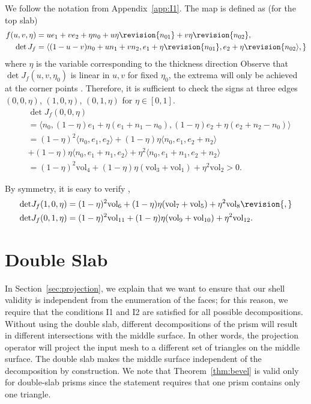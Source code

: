 We follow the notation from {Appendix~\ref{app:I1}.} 
The map is defined as (for the top slab)
\begin{align*}
    f(u,v,\eta) &= u e_1 + v e_2  + \eta n_0 + u \eta \revision{n_{01}} +
    v \eta \revision{n_{02}},\\
    \det J_f &=  \langle (1-u-v) n_0 + u n_1 + v n_2, e_1 + \eta \revision{n_{01}},
    e_2 + \eta \revision{n_{02} \rangle,}
\end{align*}
where $\eta$ is the variable corresponding to the thickness direction
Observe that $\det J_f(u,v,\eta_0)$ is linear in $u,v$ for fixed $\eta_0$, the extrema will only be achieved at the corner points \cite{knabner2001invertibility}. Therefore, it is sufficient to check the signs at three edges
$(0,0,\eta)$, $(1,0,\eta)$, $(0,1,\eta)$ for $\eta \in [0,1]$.
\begin{align*}
    & \det J_f(0,0,\eta) \\
    &= \langle n_0, (1-\eta)e_1 +\eta (e_1 + n_1 - n_0),(1-\eta)e_2 +\eta (e_2 + n_2 - n_0) \rangle \\
    &= (1-\eta)^2\langle n_0, e_1, e_2 \rangle + 
    (1-\eta)\eta \langle n_0,e_1, e_2+n_2\rangle \\&+ 
    (1-\eta)\eta \langle n_0, e_1+n_1, e_2\rangle + 
    \eta^2\langle n_0, e_1+n_1, e_2 + n_2\rangle\\
    &= (1-\eta)^2 \text{vol}_4 + (1-\eta)\eta (\text{vol}_3 +\text{vol}_1) + \eta^2 \text{vol}_2 > 0.
\end{align*}

By symmetry, 
it is easy to verify ,
\begin{align*}
    \det& J_f(1,0,\eta) = (1-\eta)^2 \text{vol}_6 + (1-\eta)\eta (\text{vol}_7 +\text{vol}_5) + \eta^2 \text{vol}_8\revision{,} \\
    \det& J_f(0,1,\eta) = (1-\eta)^2 \text{vol}_{11} + (1-\eta)\eta (\text{vol}_9 +\text{vol}_{10}) + \eta^2 \text{vol}_{12}.\\
\end{align*}


\section{Double Slab}\label{app:dblayer}
In Section~\ref{sec:projection}, we explain that we want to ensure that our shell validity is independent from the enumeration of the faces; for this reason, we require that the conditions I1 and I2 are satisfied for all possible decompositions. Without using the double slab, different decompositions of the prism will result in  different intersections with the middle surface. In other words, the projection operator will project the input mesh to a different set of triangles on the middle surface. 
The double slab makes the middle surface independent of the decomposition by construction. 
We note that Theorem~\ref{thm:bevel} is valid only for double-slab prisms since the statement requires that one prism contains only one triangle.

